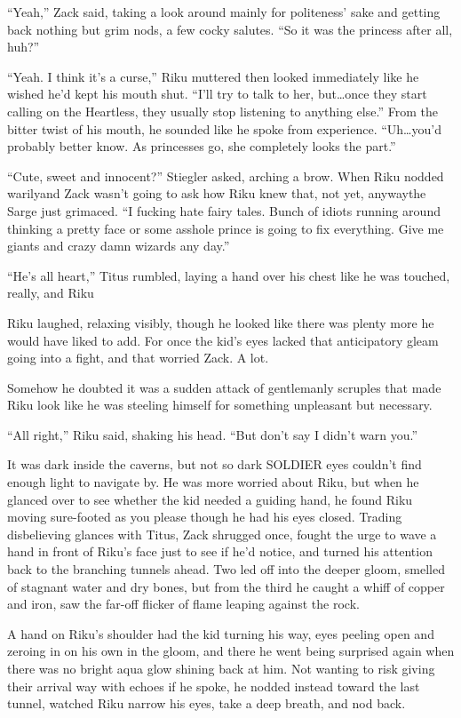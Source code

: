``Yeah,'' Zack said, taking a look around mainly for politeness' sake and getting back nothing but grim nods, a few cocky salutes. ``So it was the princess after all, huh?''

``Yeah. I think it's a curse,'' Riku muttered then looked immediately like he wished he'd kept his mouth shut. ``I'll try to talk to her, but\ldots once they start calling on the Heartless, they usually stop listening to anything else.'' From the bitter twist of his mouth, he sounded like he spoke from experience. ``Uh\ldots you'd probably better know. As princesses go, she completely looks the part.''

``Cute, sweet and innocent?'' Stiegler asked, arching a brow. When Riku nodded warily\textemdash and Zack wasn't going to ask how Riku knew that, not yet, anyway\textemdash the Sarge just grimaced. ``I fucking hate fairy tales. Bunch of idiots running around thinking a pretty face or some asshole prince is going to fix everything. Give me giants and crazy damn wizards any day.''

``He's all heart,'' Titus rumbled, laying a hand over his chest like he was touched, really, and Riku\textemdash 

Riku laughed, relaxing visibly, though he looked like there was plenty more he would have liked to add. For once the kid's eyes lacked that anticipatory gleam going into a fight, and that worried Zack. A lot.

Somehow he doubted it was a sudden attack of gentlemanly scruples that made Riku look like he was steeling himself for something unpleasant but necessary.

``All right,'' Riku said, shaking his head. ``But don't say I didn't warn you.''

It was dark inside the caverns, but not so dark SOLDIER eyes couldn't find enough light to navigate by. He was more worried about Riku, but when he glanced over to see whether the kid needed a guiding hand, he found Riku moving sure-footed as you please though he had his eyes closed. Trading disbelieving glances with Titus, Zack shrugged once, fought the urge to wave a hand in front of Riku's face just to see if he'd notice, and turned his attention back to the branching tunnels ahead. Two led off into the deeper gloom, smelled of stagnant water and dry bones, but from the third he caught a whiff of copper and iron, saw the far-off flicker of flame leaping against the rock.

A hand on Riku's shoulder had the kid turning his way, eyes peeling open and zeroing in on his own in the gloom, and there he went being surprised again when there was no bright aqua glow shining back at him. Not wanting to risk giving their arrival way with echoes if he spoke, he nodded instead toward the last tunnel, watched Riku narrow his eyes, take a deep breath, and nod back.


